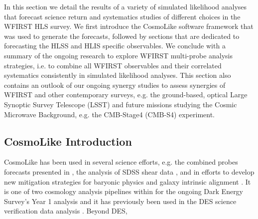 \newcommand{\nn}{\nonumber}
\newcommand{\vpi}{\mathbf \pi}
\newcommand{\vecd}{\mathbf d}
\newcommand{\matC}{\mathbf C}
\newcommand{\matQ}{\mathbf Q}

\newcommand{\om}{\Omega_\mr m}
\newcommand{\omb}{\Omega_\mr b}
\newcommand{\sig}{\sigma_8}
\newcommand{\ns}{n_s}
\newcommand{\w}{w_0}
\newcommand{\wa}{w_a}

\renewcommand{\d}{{\rm d}}
\newcommand{\pd}{P_{\delta}}
\newcommand{\pe}{P_\mr E}

\newcommand{\vt}{\vartheta}
\newcommand{\vp}{\varphi}
\newcommand{\eps}{\epsilon}
\newcommand{\abs}[1]{| #1 |}
\newcommand{\mr}{\mathrm}

\renewcommand{\d}{{\rm d}}

\newcommand{\like}{L}
\newcommand{\prob}{P}
\newcommand{\probr}{P_r}
\newcommand{\p}{\mathbf p}
\newcommand{\pco}{\mathbf p_\mr{c}}
\newcommand{\pnu}{\mathbf p_\mr{n}}
\newcommand{\plf}{\mathbf p_\mr{LF}}
\newcommand{\D}{\mathbf D}
\newcommand{\Del}{\mathbf \Delta}
\newcommand{\M}{\mathbf M}
\newcommand{\N}{\mathbf N}
\newcommand{\U}{\mathbf U}


In this section we detail the results of a variety of simulated likelihood analyses that forecast science return and systematics studies of different choices in the WFIRST HLS survey. We first introduce the CosmoLike software framework that was used to generate the forecasts, followed by sections that are dedicated to forecasting the HLSS and HLIS specific observables. We conclude with a summary of the ongoing research to explore WFIRST multi-probe analysis strategies, i.e. to combine all WFIRST observables and their correlated systematics consistently in simulated likelihood analyses. This section also contains an outlook of our ongoing synergy studies to assess synergies of WFIRST and other contemporary surveys, e.g. the ground-based, optical Large Synoptic Survey Telescope (LSST) and future missions studying the Cosmic Microwave Background, e.g. the CMB-Stage4 (CMB-S4) experiment.

\subsection{CosmoLike Introduction}
\label{sec:cosmolike}
CosmoLike has been used in several science efforts, e.g. the combined probes forecasts presented in \citep{Eifler2014}, the analysis of SDSS shear data \citep{Huff2014}, and in efforts to develop new mitigation strategies for baryonic physics \citep{Eifler2015} and galaxy intrinsic alignment \citep{Krause2016}. It is one of two cosmology analysis pipelines within for the ongoing Dark Energy Survey's Year 1 analysis and it has previously been used in the DES science verification data analysis \citep{The DES Collaboration 2016}. Beyond DES,  

